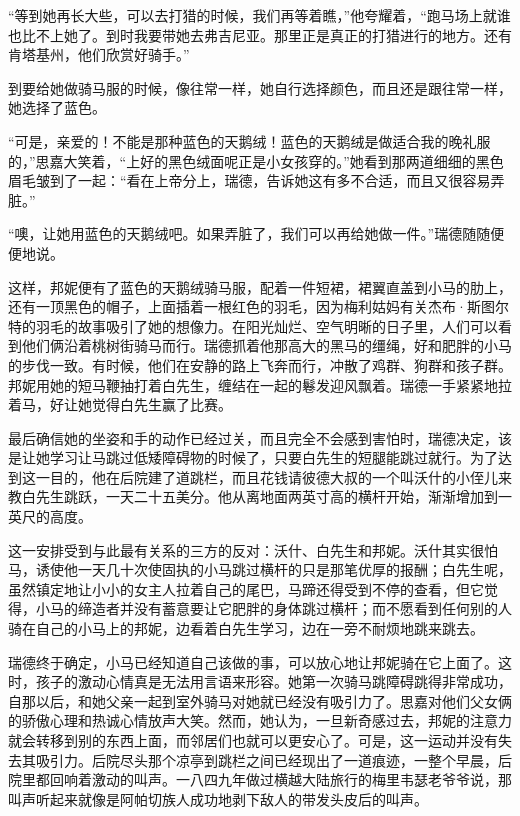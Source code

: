 \par “等到她再长大些，可以去打猎的时候，我们再等着瞧，”他夸耀着，“跑马场上就谁也比不上她了。到时我要带她去弗吉尼亚。那里正是真正的打猎进行的地方。还有肯塔基州，他们欣赏好骑手。”
\par 到要给她做骑马服的时候，像往常一样，她自行选择颜色，而且还是跟往常一样，她选择了蓝色。
\par “可是，亲爱的！不能是那种蓝色的天鹅绒！蓝色的天鹅绒是做适合我的晚礼服的，”思嘉大笑着，“上好的黑色绒面呢正是小女孩穿的。”她看到那两道细细的黑色眉毛皱到了一起：“看在上帝分上，瑞德，告诉她这有多不合适，而且又很容易弄脏。”
\par “噢，让她用蓝色的天鹅绒吧。如果弄脏了，我们可以再给她做一件。”瑞德随随便便地说。
\par 这样，邦妮便有了蓝色的天鹅绒骑马服，配着一件短裙，裙翼直盖到小马的肋上，还有一顶黑色的帽子，上面插着一根红色的羽毛，因为梅利姑妈有关杰布·斯图尔特的羽毛的故事吸引了她的想像力。在阳光灿烂、空气明晰的日子里，人们可以看到他们俩沿着桃树街骑马而行。瑞德抓着他那高大的黑马的缰绳，好和肥胖的小马的步伐一致。有时候，他们在安静的路上飞奔而行，冲散了鸡群、狗群和孩子群。邦妮用她的短马鞭抽打着白先生，缠结在一起的鬈发迎风飘着。瑞德一手紧紧地拉着马，好让她觉得白先生赢了比赛。
\par 最后确信她的坐姿和手的动作已经过关，而且完全不会感到害怕时，瑞德决定，该是让她学习让马跳过低矮障碍物的时候了，只要白先生的短腿能跳过就行。为了达到这一目的，他在后院建了道跳栏，而且花钱请彼德大叔的一个叫沃什的小侄儿来教白先生跳跃，一天二十五美分。他从离地面两英寸高的横杆开始，渐渐增加到一英尺的高度。
\par 这一安排受到与此最有关系的三方的反对：沃什、白先生和邦妮。沃什其实很怕马，诱使他一天几十次使固执的小马跳过横杆的只是那笔优厚的报酬；白先生呢，虽然镇定地让小小的女主人拉着自己的尾巴，马蹄还得受到不停的查看，但它觉得，小马的缔造者并没有蓄意要让它肥胖的身体跳过横杆；而不愿看到任何别的人骑在自己的小马上的邦妮，边看着白先生学习，边在一旁不耐烦地跳来跳去。
\par 瑞德终于确定，小马已经知道自己该做的事，可以放心地让邦妮骑在它上面了。这时，孩子的激动心情真是无法用言语来形容。她第一次骑马跳障碍跳得非常成功，自那以后，和她父亲一起到室外骑马对她就已经没有吸引力了。思嘉对他们父女俩的骄傲心理和热诚心情放声大笑。然而，她认为，一旦新奇感过去，邦妮的注意力就会转移到别的东西上面，而邻居们也就可以更安心了。可是，这一运动并没有失去其吸引力。后院尽头那个凉亭到跳栏之间已经现出了一道痕迹，一整个早晨，后院里都回响着激动的叫声。一八四九年做过横越大陆旅行的梅里韦瑟老爷爷说，那叫声听起来就像是阿帕切族人成功地剥下敌人的带发头皮后的叫声。
